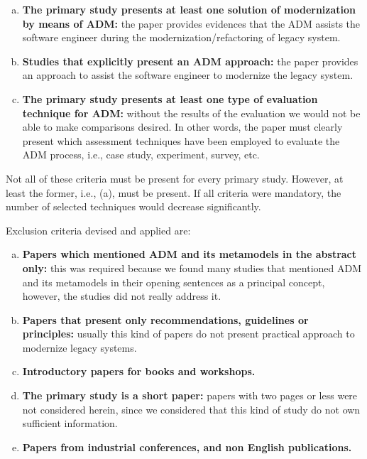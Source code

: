 \begin{enumerate}[(a)]%
\item \textbf{The primary study presents at least one solution of modernization by means of ADM:} the paper provides evidences that the ADM assists the software engineer during the modernization/refactoring of legacy system.

\item \textbf{Studies that explicitly present an ADM approach:} the paper provides an approach to assist the software engineer to modernize the legacy system.

\item \textbf{The primary study presents at least one type of evaluation technique for ADM:} without the results of the evaluation we would not be able to make comparisons desired. In other words, the paper must clearly present which assessment techniques have been employed to evaluate the ADM process, i.e., case study, experiment, survey, etc.
\end{enumerate}

Not all of these criteria must be present for every primary study. However, at least the former, i.e., (a), must be present. If all criteria were mandatory, the number of selected techniques would decrease significantly.

Exclusion criteria devised and applied are:
\begin{enumerate}[(a)]

\item \textbf{Papers which mentioned ADM and its metamodels in the abstract only:} this was required because we found many studies that mentioned ADM and its metamodels in their opening sentences as a principal concept, however, the studies did not really address it.

\item \textbf{Papers that present only recommendations, guidelines or principles:} usually this kind of papers do not present practical approach to modernize legacy systems.

\item \textbf{Introductory papers for books and workshops.}

\item \textbf{The primary study is a short paper:} papers with two pages or less were not considered herein, since we considered that this kind of study do not own sufficient information.

\item \textbf{Papers from industrial conferences, and non English publications.}
 
\end{enumerate}

